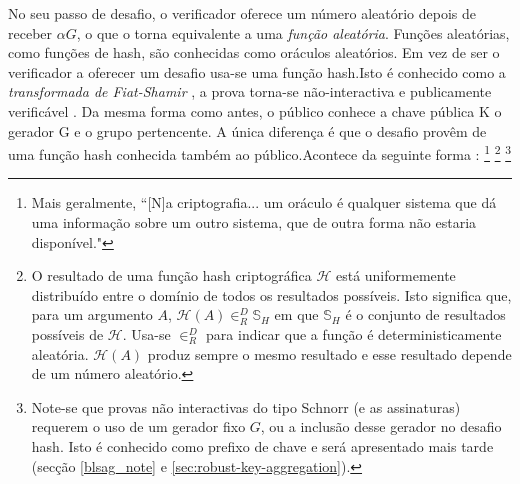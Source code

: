 \begin{enumerate}
No seu passo de desafio, o verificador oferece um número aleatório depois de receber $\alpha G$, o que o torna equivalente a uma {\em função aleatória}. Funções aleatórias, como funções de hash, são conhecidas como oráculos aleatórios. Em vez de ser o verificador a oferecer um desafio usa-se uma função hash.\newline Isto é conhecido como a {\em transformada de Fiat-Shamir} \cite{fiat-shamir-transform}, a prova torna-se não-interactiva e publicamente verificável \cite{Signatures2015BorromeanRS}. Da mesma forma como antes, o público conhece a chave pública K o gerador G e o grupo pertencente. A única diferença é que o desafio provêm de uma função hash conhecida também ao público.\newline Acontece da seguinte forma :
\footnote{Mais geralmente, ``[N]a criptografia... um oráculo é qualquer sistema que dá uma informação sobre um outro sistema, que de outra forma não estaria disponível."\cite{cryptographic-oracle}}
\footnote{O resultado de uma função hash criptográfica $\mathcal{H}$ está uniformemente distribuído entre o domínio de todos os resultados possíveis. Isto significa que, para um argumento $A$, $\mathcal{H}(A) \in^D_R \mathbb{S}_H$ em que $\mathbb{S}_H$ é o conjunto de resultados possíveis de $\mathcal{H}$. Usa-se $\in^D_R$ para indicar que a função é deterministicamente aleatória. $\mathcal{H}(A)$ produz sempre o mesmo resultado e esse resultado depende de um número aleatório.}
\footnote{Note-se que provas não interactivas do tipo Schnorr (e as assinaturas) requerem o uso de um gerador fixo $G$, ou a inclusão desse gerador no desafio hash. Isto é conhecido como prefixo de chave e será apresentado mais tarde (secção  \ref{blsag_note} e \ref{sec:robust-key-aggregation}).} 


\end{enumerate}
